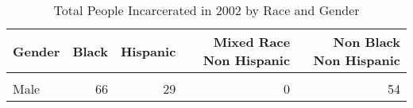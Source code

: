 \begin{table}[H]

\caption{\label{tab:tab:summarystats}Total People Incarcerated in 2002 by Race and Gender}
\centering
\begin{tabular}[t]{lrrrr}
\toprule
Gender & Black & Hispanic & Mixed Race Non Hispanic & Non Black Non Hispanic\\
\midrule
\cellcolor{gray!6}{Female} & \cellcolor{gray!6}{9} & \cellcolor{gray!6}{6} & \cellcolor{gray!6}{1} & \cellcolor{gray!6}{13}\\
Male & 66 & 29 & 0 & 54\\
\bottomrule
\end{tabular}
\end{table}
